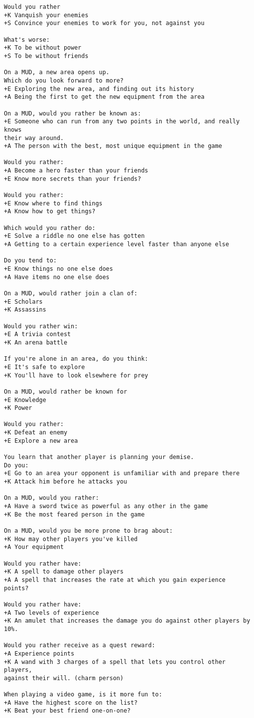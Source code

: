 \begin{verbatim}
Would you rather
+K Vanquish your enemies
+S Convince your enemies to work for you, not against you

What's worse:
+K To be without power
+S To be without friends

On a MUD, a new area opens up.
Which do you look forward to more?
+E Exploring the new area, and finding out its history
+A Being the first to get the new equipment from the area

On a MUD, would you rather be known as:
+E Someone who can run from any two points in the world, and really knows
their way around.
+A The person with the best, most unique equipment in the game

Would you rather:
+A Become a hero faster than your friends
+E Know more secrets than your friends?

Would you rather:
+E Know where to find things
+A Know how to get things?

Which would you rather do:
+E Solve a riddle no one else has gotten
+A Getting to a certain experience level faster than anyone else

Do you tend to:
+E Know things no one else does
+A Have items no one else does

On a MUD, would rather join a clan of:
+E Scholars
+K Assassins

Would you rather win:
+E A trivia contest
+K An arena battle

If you're alone in an area, do you think:
+E It's safe to explore
+K You'll have to look elsewhere for prey

On a MUD, would rather be known for
+E Knowledge
+K Power

Would you rather:
+K Defeat an enemy
+E Explore a new area

You learn that another player is planning your demise.
Do you:
+E Go to an area your opponent is unfamiliar with and prepare there
+K Attack him before he attacks you

On a MUD, would you rather:
+A Have a sword twice as powerful as any other in the game
+K Be the most feared person in the game

On a MUD, would you be more prone to brag about:
+K How may other players you've killed
+A Your equipment

Would you rather have:
+K A spell to damage other players
+A A spell that increases the rate at which you gain experience points?

Would you rather have:
+A Two levels of experience
+K An amulet that increases the damage you do against other players by 10%.

Would you rather receive as a quest reward:
+A Experience points
+K A wand with 3 charges of a spell that lets you control other players,
against their will. (charm person)

When playing a video game, is it more fun to:
+A Have the highest score on the list?
+K Beat your best friend one-on-one?
\end{verbatim}
